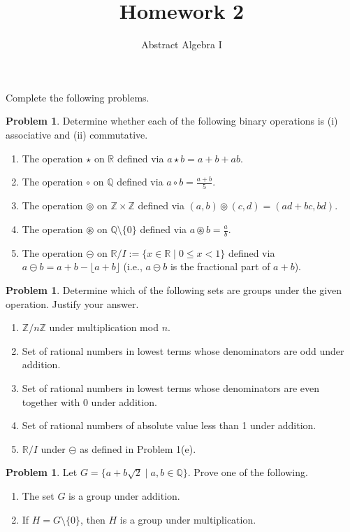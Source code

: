 \documentclass[11pt]{scrartcl}
\theoremstyle{definition}
\newtheorem{problem}[theorem]{Problem}
\begin{document}
\title{Homework 2}
\subtitle{Abstract Algebra I}
\date{}

\maketitle
\thispagestyle{fancy}

Complete the following problems.

\begin{problem}
Determine whether each of the following binary operations is (i) associative and (ii) commutative.
\begin{enumerate}[label=\rm{(\alph*)}]
\item The operation $\star$ on $\mathbb{R}$ defined via $a\star b=a+b+ab$.
\item The operation $\circ$ on $\mathbb{Q}$ defined via $\displaystyle a\circ b=\frac{a+b}{5}$.
\item The operation $\circledcirc$ on $\mathbb{Z}\times \mathbb{Z}$ defined via $(a,b)\circledcirc (c,d)=(ad+bc,bd)$.
\item The operation $\circledast$ on $\mathbb{Q}\setminus\{0\}$ defined via $\displaystyle a\circledast b=\frac{a}{b}$.
\item The operation $\circleddash$ on $\mathbb{R}/I:=\{x\in\mathbb{R}\mid 0\leq x<1\}$ defined via $a\circleddash b=a+b-\lfloor a+b\rfloor$ (i.e., $a\circleddash b$ is the fractional part of $a+b$).
\end{enumerate}
\end{problem}

\begin{problem}
Determine which of the following sets are groups under the given operation. Justify your answer.
\begin{enumerate}[label=\rm{(\alph*)}]
\item $\mathbb{Z}/n\mathbb{Z}$ under multiplication mod $n$.
\item Set of rational numbers in lowest terms whose denominators are odd under addition.
\item Set of rational numbers in lowest terms whose denominators are even together with $0$ under addition.
\item Set of rational numbers of absolute value less than 1 under addition.
\item $\mathbb{R}/I$ under $\circleddash$ as defined in Problem 1(e). 
\end{enumerate}
\end{problem}

\begin{problem}
Let $G=\{a+b\sqrt{2}\mid a,b\in\mathbb{Q}\}$.  Prove one of the following.
\begin{enumerate}[label=\rm{(\alph*)}]
\item The set $G$ is a group under addition.
\item If $H=G\setminus\{0\}$, then $H$ is a group under multiplication.
\end{enumerate}
\end{problem}
\end{document}

